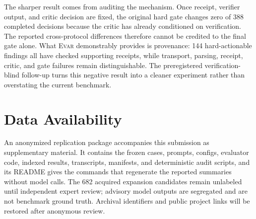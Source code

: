 \documentclass[acmsmall,screen,review,anonymous]{acmart}
\newcommand{\evar}{\textsc{Evar}\xspace}
\begin{document}
The sharper result comes from auditing the mechanism. Once receipt, verifier output, and critic decision are fixed, the original hard gate changes zero of 388 completed decisions because the critic has already conditioned on verification. The reported cross-protocol differences therefore cannot be credited to the final gate alone. What \evar demonstrably provides is provenance: 144 hard-actionable findings all have checked supporting receipts, while transport, parsing, receipt, critic, and gate failures remain distinguishable. The preregistered verification-blind follow-up turns this negative result into a cleaner experiment rather than overstating the current benchmark.

\section*{Data Availability}

An anonymized replication package accompanies this submission as supplementary material. It contains the frozen cases, prompts, configs, evaluator code, indexed results, transcripts, manifests, and deterministic audit scripts, and its README gives the commands that regenerate the reported summaries without model calls. The 682 acquired expansion candidates remain unlabeled until independent expert review; advisory model outputs are segregated and are not benchmark ground truth. Archival identifiers and public project links will be restored after anonymous review.
\end{document}
